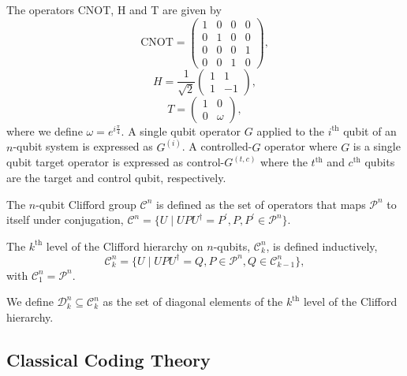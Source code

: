 \documentclass{article}
\theoremstyle{definition}
\theoremstyle{problem}
\theoremstyle{lemma}
\begin{document}
		The operators CNOT, H and T are given by
		\begin{equation}
		\label{e2_CNOT}
		\text{CNOT} = \begin{pmatrix}
		1 & 0 & 0 & 0 \\
		0 & 1 & 0 & 0 \\
		0 & 0 & 0 & 1 \\
		0 & 0 & 1 & 0
		\end{pmatrix},
		\end{equation}
		\begin{equation}
		\label{e3_H}
		H = \frac{1}{\sqrt{2}}\begin{pmatrix}
		1 & 1 \\
		1 & -1
		\end{pmatrix},
		\end{equation}
		\begin{equation}
		\label{e4_T}
		T = \begin{pmatrix}
		1 & 0 \\
		0 & \omega
		\end{pmatrix},
		\end{equation}
		where we define $\omega=e^{i\frac{\pi}{4}}$. A single qubit operator $G$ applied to the $i^\text{th}$ qubit of an $n$-qubit system is expressed as $G^{\left(i\right)}$. A controlled-$G$ operator where $G$ is a single qubit target operator is expressed as $\text{control-}G^{\left(t,c\right)}$ where the $t^\text{th}$ and $c^\text{th}$ qubits are the target and control qubit, respectively.
		
		The $n$-qubit Clifford group $\mathcal{C}^n$ is defined as the set of operators that maps $\mathcal{P}^n$ to itself under conjugation, $\mathcal{C}^n = \{U \mid UPU^\dagger = P^\prime, P, P^\prime \in \mathcal{P}^n\}$.
		
		The $k^{\text{th}}$ level of the Clifford hierarchy on $n$-qubits, $\mathcal{C}_k^n$, is defined inductively,
		\begin{equation}
		\mathcal{C}_k^n = \{U \mid UPU^\dagger = Q, P \in \mathcal{P}^n, Q \in \mathcal{C}_{k-1}^n\},
		\end{equation}
		with $\mathcal{C}_1^n = \mathcal{P}^n$.
		
		We define $\mathcal{D}_k^n \subseteq \mathcal{C}_k^n$ as the set of diagonal elements of the $k^{\text{th}}$ level of the Clifford hierarchy.
		
		\subsection{Classical Coding Theory}
		
\end{document}
